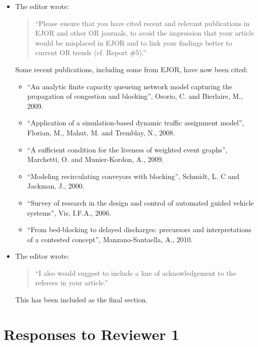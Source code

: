 \documentclass{article}
\begin{document}
\begin{itemize}

\item The editor wrote:
\begin{quote}
``Please ensure that you have cited recent and relevant publications in EJOR
and other OR journals, to avoid the impression that your article would be
misplaced in EJOR and to link your findings better to current OR trends
(cf. Report \#5).''
\end{quote}
Some recent publications, including some from EJOR, have now been cited:
\begin{itemize}
\item ``An analytic finite capacity queueing network model capturing the
propagation of congestion and blocking'', Osorio, C. and Bierlaire, M., 2009.
\item ``Application of a simulation-based dynamic traffic assignment model'',
Florian, M., Mahut, M. and Tremblay, N., 2008.
\item ``A sufficient condition for the liveness of weighted event graphs'',
Marchetti, O. and Munier-Kordon, A., 2009.
\item ``Modeling recirculating conveyors with blocking'', Schmidt, L. C and
Jackman, J., 2000.
\item ``Survey of research in the design and control of automated guided
vehicle systems'', Vis, I.F.A., 2006.
\item ``From bed-blocking to delayed discharges: precursors and
interpretations of a contested concept'', Manzano-Santaella, A., 2010.
\end{itemize}


\item The editor wrote:
\begin{quote}
``I also would suggest to include a line of acknowledgement to the referees
in your article.''
\end{quote}
This has been included as the final section.

\end{itemize}


\section*{Responses to Reviewer 1}
\end{document}
